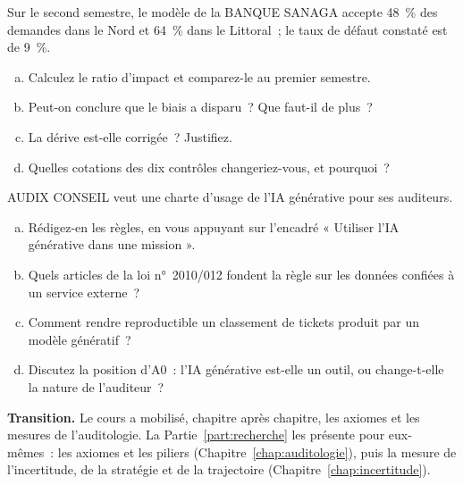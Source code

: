\begin{boxexo}[title={\ding{45}\quad Exercice~20.2. Biais et dérive \niveaumoyen}]
Sur le second semestre, le modèle de la BANQUE SANAGA accepte 48~\% des
demandes dans le Nord et 64~\% dans le Littoral~; le taux de défaut
constaté est de 9~\%.
\begin{enumerate}[(a)]
    \item Calculez le ratio d'impact et comparez-le au premier semestre.
    \item Peut-on conclure que le biais a disparu~? Que faut-il de plus~?
    \item La dérive est-elle corrigée~? Justifiez.
    \item Quelles cotations des dix contrôles changeriez-vous, et pourquoi~?
\end{enumerate}
\end{boxexo}

\begin{boxexo}[title={\ding{45}\quad Exercice~20.3. Une charte d'usage de l'IA générative \niveauexpert}]
AUDIX CONSEIL veut une charte d'usage de l'IA générative pour ses
auditeurs.
\begin{enumerate}[(a)]
    \item Rédigez-en les règles, en vous appuyant sur l'encadré « Utiliser
          l'IA générative dans une mission ».
    \item Quels articles de la loi n°~2010/012 fondent la règle sur les
          données confiées à un service externe~?
    \item Comment rendre reproductible un classement de tickets produit par
          un modèle génératif~?
    \item Discutez la position d'A0~: l'IA générative est-elle un outil, ou
          change-t-elle la nature de l'auditeur~?
\end{enumerate}
\end{boxexo}

\bigskip

\begin{boxinfo}
\textbf{Transition.} Le cours a mobilisé, chapitre après chapitre, les
axiomes et les mesures de l'auditologie. La Partie~\ref{part:recherche}
les présente pour eux-mêmes~: les axiomes et les piliers
(Chapitre~\ref{chap:auditologie}), puis la mesure de l'incertitude, de la
stratégie et de la trajectoire (Chapitre~\ref{chap:incertitude}).
\end{boxinfo}
